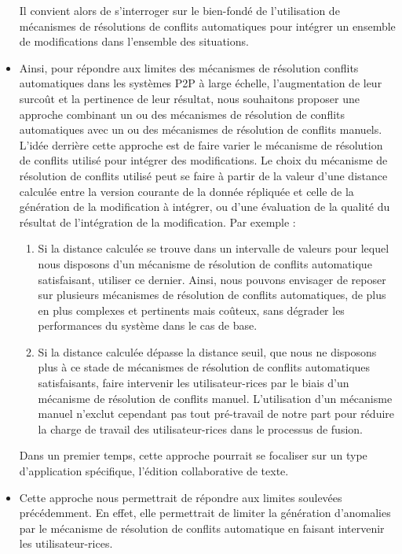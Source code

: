 \begin{itemize}
        Il convient alors de s'interroger sur le bien-fondé de l'utilisation de mécanismes de résolutions de conflits automatiques pour intégrer un ensemble de modifications dans l'ensemble des situations.
    \item Ainsi, pour répondre aux limites des mécanismes de résolution conflits automatiques dans les systèmes \ac{P2P} à large échelle, \ie l'augmentation de leur surcoût et la pertinence de leur résultat, nous souhaitons proposer une approche combinant un ou des mécanismes de résolution de conflits automatiques avec un ou des mécanismes de résolution de conflits manuels.
        L'idée derrière cette approche est de faire varier le mécanisme de résolution de conflits utilisé pour intégrer des modifications.
        Le choix du mécanisme de résolution de conflits utilisé peut se faire à partir de la valeur d'une distance calculée entre la version courante de la donnée répliquée et celle de la génération de la modification à intégrer, ou d'une évaluation de la qualité du résultat de l'intégration de la modification.
        Par exemple :
        \begin{enumerate}
            \item Si la distance calculée se trouve dans un intervalle de valeurs pour lequel nous disposons d'un mécanisme de résolution de conflits automatique satisfaisant, utiliser ce dernier.
                Ainsi, nous pouvons envisager de reposer sur plusieurs mécanismes de résolution de conflits automatiques, de plus en plus complexes et pertinents mais coûteux, sans dégrader les performances du système dans le cas de base.
            \item Si la distance calculée dépasse la distance seuil, \ie que nous ne disposons plus à ce stade de mécanismes de résolution de conflits automatiques satisfaisants, faire intervenir les utilisateur-rices par le biais d'un mécanisme de résolution de conflits manuel.
                L'utilisation d'un mécanisme manuel n'exclut cependant pas tout pré-travail de notre part pour réduire la charge de travail des utilisateur-rices dans le processus de fusion.
        \end{enumerate}
        Dans un premier temps, cette approche pourrait se focaliser sur un type d'application spécifique, \eg l'édition collaborative de texte.
    \item Cette approche nous permettrait de répondre aux limites soulevées précédemment.
        En effet, elle permettrait de limiter la génération d'anomalies par le mécanisme de résolution de conflits automatique en faisant intervenir les utilisateur-rices.

\end{itemize}
